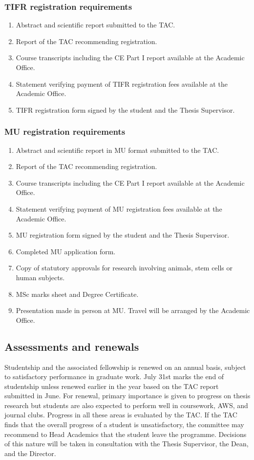 \documentclass[a4paper,10pt]{article}
\begin{document}
\subsubsection{TIFR registration requirements}
\begin{enumerate}
    \item  Abstract and scientific report submitted to the TAC.
    \item  Report of the TAC recommending registration.
    \item  Course transcripts including the CE Part I report available at the Academic Office.
    \item  Statement verifying payment of TIFR registration fees available at the Academic Office.
    \item  TIFR registration form signed by the student and the Thesis Supervisor.
\end{enumerate}

\subsubsection{MU registration requirements}
\begin{enumerate}
    \item  Abstract and scientific report in MU format submitted to the TAC.
    \item  Report of the TAC recommending registration.
    \item  Course transcripts including the CE Part I report available at the Academic Office.
    \item  Statement verifying payment of MU registration fees available at the Academic Office.
    \item  MU registration form signed by the student and the Thesis Supervisor.
    \item  Completed MU application form.
    \item  Copy of statutory approvals for research involving animals, stem cells or human subjects.
    \item  MSc marks sheet and Degree Certificate.
    \item  Presentation made in person at MU. Travel will be arranged by the Academic Office.
\end{enumerate}

	
\subsection{Assessments and renewals}
Studentship and the associated fellowship is renewed on an
annual basis, subject to satisfactory performance in graduate work. July 31st marks the end
of studentship unless renewed earlier in the year based on the TAC report submitted in June.
For renewal, primary importance is given to progress on thesis research but students are also
expected to perform well in coursework, AWS, and journal clubs. Progress in all these areas
is evaluated by the TAC. If the TAC finds that the overall progress of a student is
unsatisfactory, the committee may recommend to Head Academics that the student leave the
programme. Decisions of this nature will be taken in consultation with the Thesis
Supervisor, the Dean, and the Director.
\end{document}
